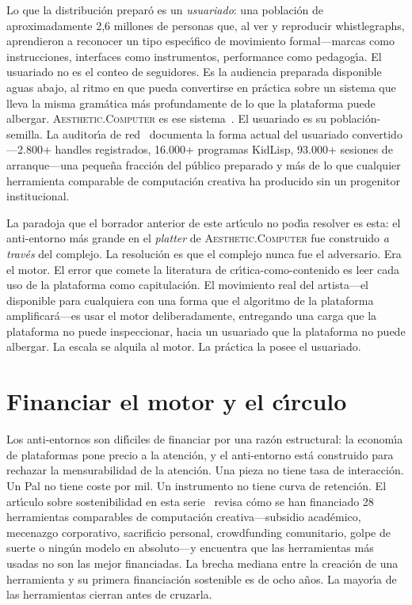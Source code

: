 \documentclass[10pt,letterpaper,twocolumn]{article}
\newcommand{\ac}{\textsc{Aesthetic.Computer}}
\begin{document}
Lo que la distribuci\'{o}n prepar\'{o} es un \emph{usuariado}: una poblaci\'{o}n de aproximadamente 2,6 millones de personas que, al ver y reproducir whistlegraphs, aprendieron a reconocer un tipo espec\'{\i}fico de movimiento formal---marcas como instrucciones, interfaces como instrumentos, performance como pedagog\'{\i}a. El usuariado no es el conteo de seguidores. Es la audiencia preparada disponible aguas abajo, al ritmo en que pueda convertirse en pr\'{a}ctica sobre un sistema que lleva la misma gram\'{a}tica m\'{a}s profundamente de lo que la plataforma puede albergar. \ac{} es ese sistema~\citep{scudder2026ac}. El usuariado es su poblaci\'{o}n-semilla. La auditor\'{\i}a de red~\citep{scudder2026audit} documenta la forma actual del usuariado convertido---2.800+ handles registrados, 16.000+ programas KidLisp, 93.000+ sesiones de arranque---una peque\~{n}a fracci\'{o}n del p\'{u}blico preparado y m\'{a}s de lo que cualquier herramienta comparable de computaci\'{o}n creativa ha producido sin un progenitor institucional.

La paradoja que el borrador anterior de este art\'{\i}culo no pod\'{\i}a resolver es esta: el anti-entorno m\'{a}s grande en el \emph{platter} de \ac{} fue construido \emph{a trav\'{e}s} del complejo. La resoluci\'{o}n es que el complejo nunca fue el adversario. Era el motor. El error que comete la literatura de cr\'{\i}tica-como-contenido es leer cada uso de la plataforma como capitulaci\'{o}n. El movimiento real del artista---el disponible para cualquiera con una forma que el algoritmo de la plataforma amplificar\'{a}---es usar el motor deliberadamente, entregando una carga que la plataforma no puede inspeccionar, hacia un usuariado que la plataforma no puede albergar. La escala se alquila al motor. La pr\'{a}ctica la posee el usuariado.

\section{Financiar el motor y el c\'{\i}rculo}

Los anti-entornos son dif\'{\i}ciles de financiar por una raz\'{o}n estructural: la econom\'{\i}a de plataformas pone precio a la atenci\'{o}n, y el anti-entorno est\'{a} construido para rechazar la mensurabilidad de la atenci\'{o}n. Una pieza no tiene tasa de interacci\'{o}n. Un Pal no tiene coste por mil. Un instrumento no tiene curva de retenci\'{o}n. El art\'{\i}culo sobre sostenibilidad en esta serie~\citep{scudder2026sustainability} revisa c\'{o}mo se han financiado 28 herramientas comparables de computaci\'{o}n creativa---subsidio acad\'{e}mico, mecenazgo corporativo, sacrificio personal, crowdfunding comunitario, golpe de suerte o ning\'{u}n modelo en absoluto---y encuentra que las herramientas m\'{a}s usadas no son las mejor financiadas. La brecha mediana entre la creaci\'{o}n de una herramienta y su primera financiaci\'{o}n sostenible es de ocho a\~{n}os. La mayor\'{\i}a de las herramientas cierran antes de cruzarla.
\end{document}
